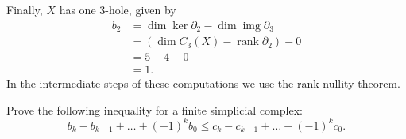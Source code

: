 \documentclass[12 pt, letterpaper]{hmcpset}
\begin{document}
\begin{solution}
\begin{enumerate}
			Finally, $X$ has one $3$-hole, given by
			\begin{align*}
				b_{2} & = \dim \ker \partial_{2} - \dim \operatorname{img} \partial_{3} \\
				      & = (\dim C_{3}(X) - \operatorname{rank} \partial_{2}) - 0 \\
				      & = 5 - 4 - 0 \\
				      & = 1.
			\end{align*}
			In the intermediate steps of these computations we use the rank-nullity theorem.
	\end{enumerate}
\end{solution}

\pagebreak

\begin{problem}
	Prove the following inequality for a finite simplicial complex:
	\[
		b_{k} - b_{k - 1} + \dots + (-1)^{k} b_{0} \le c_{k} - c_{k - 1} + \dots + (-1)^{k} c_{0}.
	\]
\end{problem}
\end{document}
